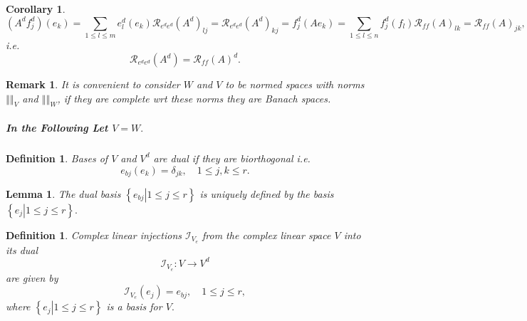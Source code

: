 \documentclass[aps,preprint]{revtex4}%
\newtheorem{corollary}[theorem]{Corollary}
\newtheorem{definition}[theorem]{Definition}
\newtheorem{lemma}[theorem]{Lemma}
\newtheorem{remark}[theorem]{Remark}
\begin{document}
\begin{corollary}%
\begin{equation}
\left(  A^{d}f_{j}^{d}\right)  \left(  e_{k}\right)  =\sum_{1\leq l\leq
m}e_{l}^{d}\left(  e_{k}\right)  \mathcal{R}_{e^{d}e^{d}}\left(  A^{d}\right)
_{lj}=\mathcal{R}_{e^{d}e^{d}}\left(  A^{d}\right)  _{kj}=f_{j}^{d}\left(
Ae_{k}\right)  =\sum_{1\leq l\leq n}f_{j}^{d}\left(  f_{l}\right)
\mathcal{R}_{ff}\left(  A\right)  _{lk}=\mathcal{R}_{ff}\left(  A\right)
_{jk},
\end{equation}
i.e.%
\begin{equation}
\mathcal{R}_{e^{d}e^{d}}\left(  A^{d}\right)  =\mathcal{R}_{ff}\left(
A\right)  ^{d}.
\end{equation}

\end{corollary}

\begin{remark}
It is convenient to consider $W$ and $V$ to be normed spaces with norms
$\left\Vert {}\right\Vert _{V}$ and $\left\Vert {}\right\Vert _{W}$, if they
are complete wrt these norms they are \emph{Banach} spaces.
\end{remark}

\subparagraph{In the Following Let $V=W.$}

\begin{definition}
Bases of $V$ and $V^{d}$ are dual if they are biorthogonal i.e.
\begin{equation}
e_{bj}\left(  e_{k}\right)  =\delta_{jk},\quad1\leq j,k\leq r.
\end{equation}

\end{definition}

\begin{lemma}
The dual basis $\left\{  \left.  e_{bj}\right\vert 1\leq j\leq r\right\}  $ is
uniquely defined by the basis $\left\{  \left.  e_{j}\right\vert 1\leq j\leq
r\right\}  .$
\end{lemma}

\begin{definition}
Complex linear \emph{injections} $\mathcal{I}_{V_{e}}$ from the complex linear
space $V$ into its dual
\begin{equation}
\mathcal{I}_{V_{e}}:V\rightarrow V^{d}%
\end{equation}
are given by%
\begin{equation}
\mathcal{I}_{V_{e}}\left(  e_{j}\right)  =e_{bj},\quad1\leq j\leq r,
\end{equation}
where $\left\{  \left.  e_{j}\right\vert 1\leq j\leq r\right\}  $ is a basis
for $V.$
\end{definition}
\end{document}
